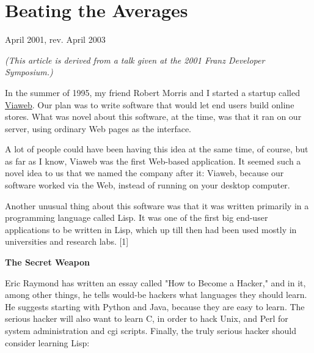 \chapter{Beating the Averages}


            
              
                


                  
                    April 2001, rev. April 2003

\emph{(This article is derived from a talk given at the 2001
                      Franz Developer Symposium.) }

In the summer of 1995, my friend Robert Morris
                    and I started a startup called
                    \href{http://docs.yahoo.com/docs/pr/release184.html}{Viaweb}. Our plan was to write software that would let end users
                    build online stores. What was novel about this software, at
                    the time, was that it ran on our server, using ordinary Web
                    pages as the interface.

A lot of people could
                    have been having this idea at the same time, of course, but
                    as far as I know, Viaweb was the first Web-based
                    application. It seemed such a novel idea to us that we named
                    the company after it: Viaweb, because our software worked
                    via the Web, instead of running on your desktop computer.

Another
                    unusual thing about this software was that it was written
                    primarily in a programming language called Lisp. It was one
                    of the first big end-user applications to be written in
                    Lisp, which up till then had been used mostly in
                    universities and research labs. [1]

\textbf{The Secret Weapon}

Eric Raymond has written an essay called "How
                    to Become a Hacker," and in it, among other things, he tells
                    would-be hackers what languages they should learn. He
                    suggests starting with Python and Java, because they are
                    easy to learn. The serious hacker will also want to learn C,
                    in order to hack Unix, and Perl for system administration
                    and cgi scripts. Finally, the truly serious hacker should
                    consider learning Lisp:
                  


